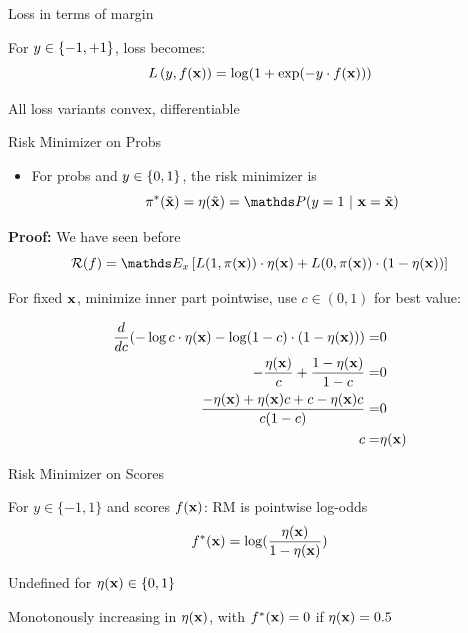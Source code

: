\documentclass[11pt,compress,t,notes=noshow, xcolor=table]{beamer}
\begin{document}
\begin{framei}[sep=M]{Loss in terms of margin}

\item For $y \in \{-1, +1\}$, loss becomes: 
$$
L\left(y, f(\mathbf{x})\right) = \log(1+\exp(-y \cdot f(\mathbf{x}))) 
$$
\item All loss variants convex, differentiable

\vfill



\end{framei}


\begin{frame}{Risk Minimizer on Probs}

\begin{itemize}
\item For probs and $y \in \{0, 1\}$, the risk minimizer is
$$
\piastxtil = \eta(\xtil) = \P(y = 1 ~|~ \xv = \xtil) 
$$
\end{itemize}


\textbf{Proof:} We have seen before
$$
\riskf = \E_x \left[L(1, \pix) \cdot \eta(\xv) + L(0, \pix) \cdot (1 - \eta(\xv)) \right]
$$

For fixed $\mathbf{x}$, minimize inner part pointwise, use $c\in(0,1)$ for best value:

{\footnotesize
\begin{align*}
\frac{d }{d c} (- \log c  \cdot \eta(\mathbf{x})- \log (1 - c) \cdot (1 - \eta(\mathbf{x}))) =& 0 \\
- \frac{\eta(\mathbf{x})}{c} + \frac{1 - \eta(\mathbf{x})}{1 - c} =& 0 \\
\frac{- \eta(\mathbf{x}) + \eta(\mathbf{x}) c + c - \eta(\mathbf{x}) c}{c (1 - c)} =& 0 \\
c =& \eta(\mathbf{x})
\end{align*}
}

\end{frame}

\begin{framei}[sep=S]{Risk Minimizer on Scores}

\item For $y \in \{-1, 1\}$ and scores $f(\mathbf{x})$: RM is pointwise log-odds
$$f^{\ast}(\mathbf{x}) =  \log (\frac{\eta(\mathbf{x}) }{1-\eta(\mathbf{x}) })$$
\item Undefined for $\eta(\mathbf{x}) \in \{0, 1\}$
\item Monotonously increasing in $\eta(\mathbf{x})$, with  $f^{\ast}(\mathbf{x}) = 0$ if $\eta(\mathbf{x})=0.5$

\vfill



\end{framei}
\end{document}
